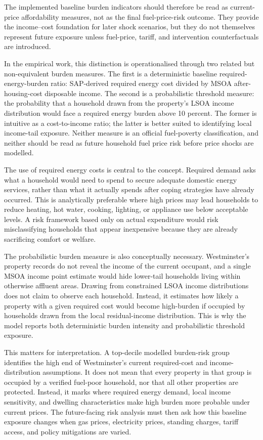 The implemented baseline burden indicators should therefore be read as current-price affordability measures, not as the final fuel-price-risk outcome. They provide the income--cost foundation for later shock scenarios, but they do not themselves represent future exposure unless fuel-price, tariff, and intervention counterfactuals are introduced.

In the empirical work, this distinction is operationalised through two related but non-equivalent burden measures. The first is a deterministic baseline required-energy-burden ratio: SAP-derived required energy cost divided by MSOA after-housing-cost disposable income. The second is a probabilistic threshold measure: the probability that a household drawn from the property's LSOA income distribution would face a required energy burden above 10 percent. The former is intuitive as a cost-to-income ratio; the latter is better suited to identifying local income-tail exposure. Neither measure is an official fuel-poverty classification, and neither should be read as future household fuel price risk before price shocks are modelled.

The use of required energy costs is central to the concept. Required demand asks what a household would need to spend to secure adequate domestic energy services, rather than what it actually spends after coping strategies have already occurred. This is analytically preferable where high prices may lead households to reduce heating, hot water, cooking, lighting, or appliance use below acceptable levels. A risk framework based only on actual expenditure would risk misclassifying households that appear inexpensive because they are already sacrificing comfort or welfare.

The probabilistic burden measure is also conceptually necessary. Westminster's property records do not reveal the income of the current occupant, and a single MSOA income point estimate would hide lower-tail households living within otherwise affluent areas. Drawing from constrained LSOA income distributions does not claim to observe each household. Instead, it estimates how likely a property with a given required cost would become high-burden if occupied by households drawn from the local residual-income distribution. This is why the model reports both deterministic burden intensity and probabilistic threshold exposure.

This matters for interpretation. A top-decile modelled burden-risk group identifies the high end of Westminster's current required-cost and income-distribution assumptions. It does not mean that every property in that group is occupied by a verified fuel-poor household, nor that all other properties are protected. Instead, it marks where required energy demand, local income sensitivity, and dwelling characteristics make high burden more probable under current prices. The future-facing risk analysis must then ask how this baseline exposure changes when gas prices, electricity prices, standing charges, tariff access, and policy mitigations are varied.

